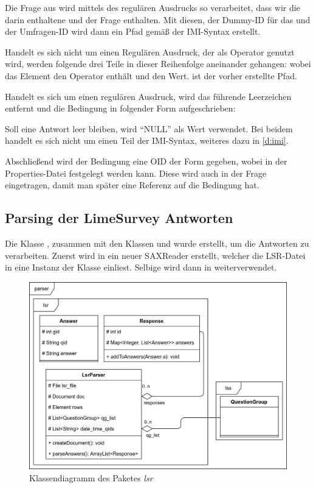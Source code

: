 Die Frage aus  wird mittels des regulären Ausdrucks
\noindent so verarbeitet, dass wir die darin enthaltene  und  der Frage enthalten.
Mit diesen, der Dummy-ID für das  und der Umfragen-ID wird dann ein Pfad gemäß der IMI-Syntax erstellt.

Handelt es sich nicht um einen Regulären Ausdruck, der als Operator genutzt wird, werden folgende drei Teile in dieser Reihenfolge aneinander gehangen: 
\noindent wobei das Element  den Operator enthält und  den Wert.  ist der vorher erstellte Pfad.

Handelt es sich um einen regulären Ausdruck, wird das führende Leerzeichen entfernt und die Bedingung in folgender Form aufgeschrieben:

Soll eine Antwort leer bleiben, wird \enquote{NULL} als Wert verwendet.
Bei beidem handelt es sich nicht um einen Teil der IMI-Syntax, weiteres dazu in \cref{d:imi}.

Abschließend wird der Bedingung eine OID der Form  gegeben, wobei  in der Properties-Datei festgelegt werden kann.
Diese wird auch in der Frage eingetragen, damit man später eine Referenz auf die Bedingung hat.

\subsection{Parsing der LimeSurvey Antworten}
\label{im:ans}

Die Klasse , zusammen mit den Klassen  und  wurde erstellt, um die Antworten zu verarbeiten.
Zuerst wird in  ein neuer SAXReader erstellt, welcher die LSR-Datei in eine Instanz der Klasse  einliest.
Selbige wird dann in  weiterverwendet.

\begin{figure}[h]
			\centering
			\includegraphics[width=.98\textwidth]{./img/cls_lsr.png}
			\caption{Klassendiagramm des Paketes \textit{lsr}}
\end{figure}

